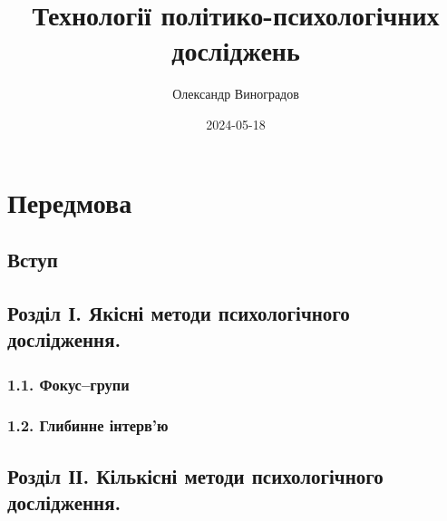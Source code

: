 \documentclass[
  10pt,
  a5paper,
  DIV=11,
  numbers=noendperiod]{scrreprt}
\title{Технології політико-психологічних досліджень}
\author{Олександр Виноградов}
\date{2024-05-18}
\renewcommand*\contentsname{Table of contents}
\newcommand\contentsname{Table of contents}
\begin{document}
\maketitle

\renewcommand*\contentsname{Зміст}
{
\hypersetup{linkcolor=}
\setcounter{tocdepth}{2}
\tableofcontents
}

\chapter*{Передмова}\label{ux43fux435ux440ux435ux434ux43cux43eux432ux430}


\section*{Вступ}\label{ux432ux441ux442ux443ux43f}


\section*{Розділ І. Якісні методи психологічного
дослідження.}\label{ux440ux43eux437ux434ux456ux43b-ux456.-ux44fux43aux456ux441ux43dux456-ux43cux435ux442ux43eux434ux438-ux43fux441ux438ux445ux43eux43bux43eux433ux456ux447ux43dux43eux433ux43e-ux434ux43eux441ux43bux456ux434ux436ux435ux43dux43dux44f.}


\subsection*{1.1.
Фокус--групи}\label{ux444ux43eux43aux443ux441ux433ux440ux443ux43fux438}

\subsection*{1.2. Глибинне
інтерв'ю}\label{ux433ux43bux438ux431ux438ux43dux43dux435-ux456ux43dux442ux435ux440ux432ux44e}

\section*{Розділ ІІ. Кількісні методи психологічного
дослідження.}\label{ux440ux43eux437ux434ux456ux43b-ux456ux456.-ux43aux456ux43bux44cux43aux456ux441ux43dux456-ux43cux435ux442ux43eux434ux438-ux43fux441ux438ux445ux43eux43bux43eux433ux456ux447ux43dux43eux433ux43e-ux434ux43eux441ux43bux456ux434ux436ux435ux43dux43dux44f.}
\end{document}

